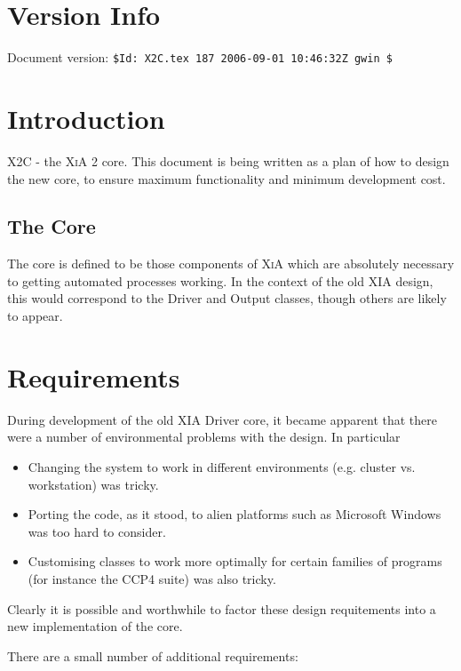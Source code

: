 \documentclass[a4paper, 11pt]{article}
\begin{document}
\section{Version Info}

Document version: \verb|$Id: X2C.tex 187 2006-09-01 10:46:32Z gwin $|

\section{Introduction}

X2C - the \textsc{XiA} 2 core. This document is being written as a plan of how
to design the new core, to ensure maximum functionality and minimum
development cost.


\subsection{The Core}

The core is defined to be those components of \textsc{XiA} which are
absolutely necessary to getting automated processes working. In the context of
the old XIA design, this would correspond to the Driver and Output classes,
though others are likely to appear.

\section{Requirements}

During development of the old XIA Driver core, it became apparent that there
were a number of environmental problems with the design. In particular

\begin{itemize}
\item{Changing the system to work in different environments (e.g. cluster
  vs. workstation) was tricky.}
\item{Porting the code, as it stood, to alien platforms such as Microsoft
  Windows was too hard to consider.}
\item{Customising classes to work more optimally for certain families of
  programs (for instance the CCP4 suite) was also tricky.}
\end{itemize}

Clearly it is possible and worthwhile to factor these design requitements into
a new implementation of the core.

There are a small number of additional requirements:
\end{document}
